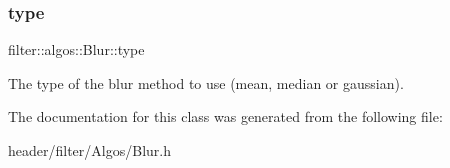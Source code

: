 \subsubsection{\texorpdfstring{type}{type}}
{\footnotesize\ttfamily filter\+::algos\+::\+Blur\+::type}

The type of the blur method to use (mean, median or gaussian). 

The documentation for this class was generated from the following file\+:\begin{DoxyCompactItemize}
\item 
header/filter/\+Algos/Blur.\+h\end{DoxyCompactItemize}
